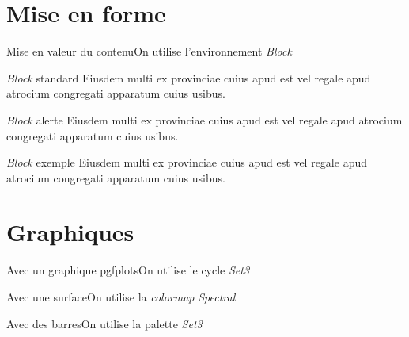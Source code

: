 \documentclass{eecslides}
\begin{document}
	\section{Mise en forme}

	\begin{frame}{Mise en valeur du contenu}{On utilise l'environnement \emph{Block}}
		\begin{center}
			\begin{block}{\emph{Block} standard}
				\small Eiusdem multi ex provinciae cuius apud est vel regale apud atrocium congregati apparatum cuius usibus.
			\end{block}
			\begin{alertblock}{\emph{Block} alerte}
				\small Eiusdem multi ex provinciae cuius apud est vel regale apud atrocium congregati apparatum cuius usibus.
			\end{alertblock}
			\begin{exampleblock}{\emph{Block} exemple}
				\small Eiusdem multi ex provinciae cuius apud est vel regale apud atrocium congregati apparatum cuius usibus.
			\end{exampleblock}
		\end{center}	
	\end{frame}	

	\section{Graphiques}

	\begin{frame}{Avec un graphique pgfplots}{On utilise le cycle \emph{Set3}}
		\begin{center}
			
		\end{center}	
	\end{frame}

	\begin{frame}{Avec une surface}{On utilise la \emph{colormap} \emph{Spectral}}
		\begin{center}
			
		\end{center}	
	\end{frame}

	\begin{frame}{Avec des barres}{On utilise la palette \emph{Set3}}
		\begin{center}
			
		\end{center}	
	\end{frame}
\end{document}
